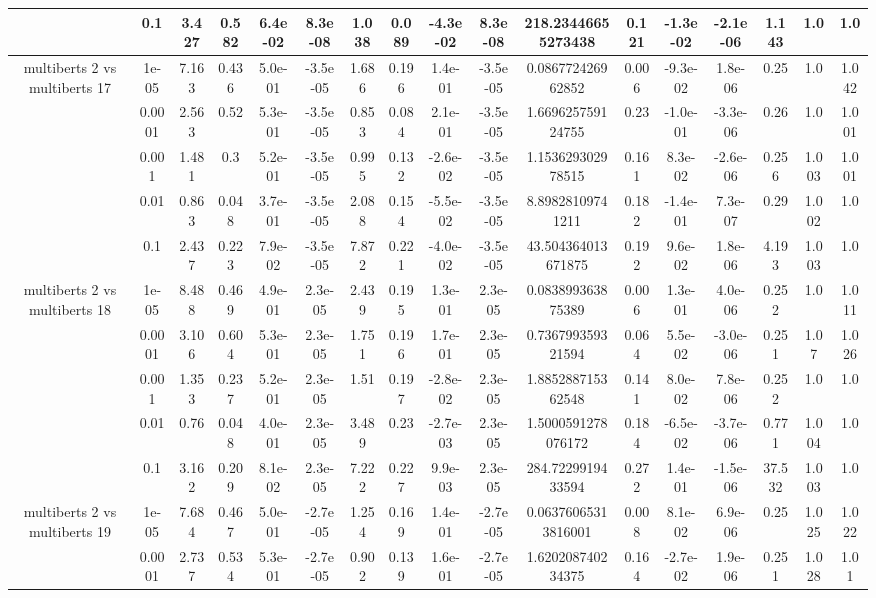 \begin{tabular}{|c|c|c|c|c|c|c|c|c|c|c|c|c|c|c|c|c|}
 & 0.1 & 3.427 & 0.582 & 6.4e-02 & 8.3e-08 & 1.038 & 0.089 & -4.3e-02 & 8.3e-08 & 218.23446655273438 & 0.121 & -1.3e-02 & -2.1e-06 & 1.143 & 1.0 & 1.0 \\
\hline
\multirow{5}{*}{multiberts 2 vs multiberts 17} & 1e-05 & 7.163 & 0.436 & 5.0e-01 & -3.5e-05 & 1.686 & 0.196 & 1.4e-01 & -3.5e-05 & 0.086772426962852 & 0.006 & -9.3e-02 & 1.8e-06 & 0.25 & 1.0 & 1.042 \\
 & 0.0001 & 2.563 & 0.52 & 5.3e-01 & -3.5e-05 & 0.853 & 0.084 & 2.1e-01 & -3.5e-05 & 1.669625759124755 & 0.23 & -1.0e-01 & -3.3e-06 & 0.26 & 1.0 & 1.001 \\
 & 0.001 & 1.481 & 0.3 & 5.2e-01 & -3.5e-05 & 0.995 & 0.132 & -2.6e-02 & -3.5e-05 & 1.153629302978515 & 0.161 & 8.3e-02 & -2.6e-06 & 0.256 & 1.003 & 1.001 \\
 & 0.01 & 0.863 & 0.048 & 3.7e-01 & -3.5e-05 & 2.088 & 0.154 & -5.5e-02 & -3.5e-05 & 8.89828109741211 & 0.182 & -1.4e-01 & 7.3e-07 & 0.29 & 1.002 & 1.0 \\
 & 0.1 & 2.437 & 0.223 & 7.9e-02 & -3.5e-05 & 7.872 & 0.221 & -4.0e-02 & -3.5e-05 & 43.504364013671875 & 0.192 & 9.6e-02 & 1.8e-06 & 4.193 & 1.003 & 1.0 \\
\hline
\multirow{5}{*}{multiberts 2 vs multiberts 18} & 1e-05 & 8.488 & 0.469 & 4.9e-01 & 2.3e-05 & 2.439 & 0.195 & 1.3e-01 & 2.3e-05 & 0.083899363875389 & 0.006 & 1.3e-01 & 4.0e-06 & 0.252 & 1.0 & 1.011 \\
 & 0.0001 & 3.106 & 0.604 & 5.3e-01 & 2.3e-05 & 1.751 & 0.196 & 1.7e-01 & 2.3e-05 & 0.736799359321594 & 0.064 & 5.5e-02 & -3.0e-06 & 0.251 & 1.07 & 1.026 \\
 & 0.001 & 1.353 & 0.237 & 5.2e-01 & 2.3e-05 & 1.51 & 0.197 & -2.8e-02 & 2.3e-05 & 1.885288715362548 & 0.141 & 8.0e-02 & 7.8e-06 & 0.252 & 1.0 & 1.0 \\
 & 0.01 & 0.76 & 0.048 & 4.0e-01 & 2.3e-05 & 3.489 & 0.23 & -2.7e-03 & 2.3e-05 & 1.5000591278076172 & 0.184 & -6.5e-02 & -3.7e-06 & 0.771 & 1.004 & 1.0 \\
 & 0.1 & 3.162 & 0.209 & 8.1e-02 & 2.3e-05 & 7.222 & 0.227 & 9.9e-03 & 2.3e-05 & 284.7229919433594 & 0.272 & 1.4e-01 & -1.5e-06 & 37.532 & 1.003 & 1.0 \\
\hline
\multirow{5}{*}{multiberts 2 vs multiberts 19} & 1e-05 & 7.684 & 0.467 & 5.0e-01 & -2.7e-05 & 1.254 & 0.169 & 1.4e-01 & -2.7e-05 & 0.06376065313816001 & 0.008 & 8.1e-02 & 6.9e-06 & 0.25 & 1.025 & 1.022 \\
 & 0.0001 & 2.737 & 0.534 & 5.3e-01 & -2.7e-05 & 0.902 & 0.139 & 1.6e-01 & -2.7e-05 & 1.620208740234375 & 0.164 & -2.7e-02 & 1.9e-06 & 0.251 & 1.028 & 1.01 \\

\end{tabular}
